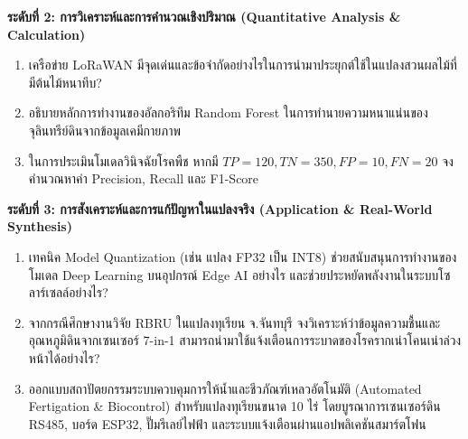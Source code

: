 \noindent \textbf{ระดับที่ 2: การวิเคราะห์และการคำนวณเชิงปริมาณ (Quantitative Analysis \& Calculation)}
\begin{enumerate}[resume]
    \item เครือข่าย LoRaWAN มีจุดเด่นและข้อจำกัดอย่างไรในการนำมาประยุกต์ใช้ในแปลงสวนผลไม้ที่มีต้นไม้หนาทึบ?
    \item อธิบายหลักการทำงานของอัลกอริทึม Random Forest ในการทำนายความหนาแน่นของจุลินทรีย์ดินจากข้อมูลเคมีกายภาพ
    \item ในการประเมินโมเดลวินิจฉัยโรคพืช หากมี $TP = 120, TN = 350, FP = 10, FN = 20$ จงคำนวณหาค่า Precision, Recall และ F1-Score
\end{enumerate}

\noindent \textbf{ระดับที่ 3: การสังเคราะห์และการแก้ปัญหาในแปลงจริง (Application \& Real-World Synthesis)}
\begin{enumerate}[resume]
    \item เทคนิค Model Quantization (เช่น แปลง FP32 เป็น INT8) ช่วยสนับสนุนการทำงานของโมเดล Deep Learning บนอุปกรณ์ Edge AI อย่างไร และช่วยประหยัดพลังงานในระบบโซลาร์เซลล์อย่างไร?
    \item จากกรณีศึกษางานวิจัย RBRU ในแปลงทุเรียน จ.จันทบุรี จงวิเคราะห์ว่าข้อมูลความชื้นและอุณหภูมิดินจากเซนเซอร์ 7-in-1 สามารถนำมาใช้แจ้งเตือนการระบาดของโรครากเน่าโคนเน่าล่วงหน้าได้อย่างไร?
    \item ออกแบบสถาปัตยกรรมระบบควบคุมการให้น้ำและชีวภัณฑ์เหลวอัตโนมัติ (Automated Fertigation \& Biocontrol) สำหรับแปลงทุเรียนขนาด 10 ไร่ โดยบูรณาการเซนเซอร์ดิน RS485, บอร์ด ESP32, ปั๊มรีเลย์ไฟฟ้า และระบบแจ้งเตือนผ่านแอปพลิเคชันสมาร์ตโฟน
\end{enumerate}
